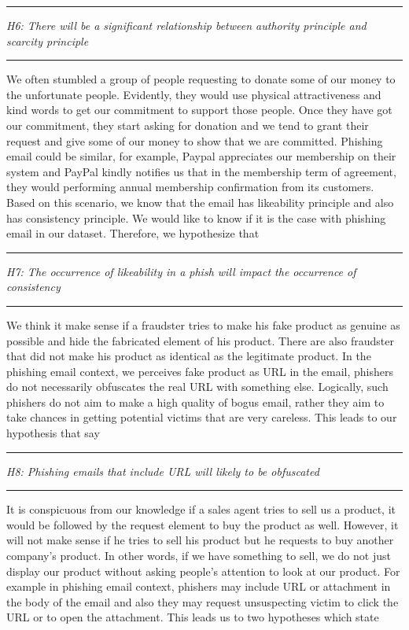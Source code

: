 \rule[0.5ex]{1\columnwidth}{1pt}

\textit{H6: There will be a significant relationship between authority
principle and scarcity principle}

\rule[0.5ex]{1\columnwidth}{1pt}

We often stumbled a group of people requesting to donate some of our
money to the unfortunate people. Evidently, they would use physical
attractiveness and kind words to get our commitment to support those
people. Once they have got our commitment, they start asking for donation
and we tend to grant their request and give some of our money to show
that we are committed. Phishing email could be similar, for example,
Paypal appreciates our membership on their system and PayPal kindly
notifies us that in the membership term of agreement, they would performing
annual membership confirmation from its customers. Based on this scenario,
we know that the email has likeability principle and also has consistency
principle. We would like to know if it is the case with phishing email
in our dataset. Therefore, we hypothesize that

\rule[0.5ex]{1\columnwidth}{1pt}

\textit{H7: The occurrence of likeability in a phish will impact the
occurrence of consistency}

\rule[0.5ex]{1\columnwidth}{1pt}

We think it make sense if a fraudster tries to make his fake product
as genuine as possible and hide the fabricated element of his product.
There are also fraudster that did not make his product as identical
as the legitimate product. In the phishing email context, we perceives
fake product as URL in the email, phishers do not necessarily obfuscates
the real URL with something else. Logically, such phishers do not
aim to make a high quality of bogus email, rather they aim to take
chances in getting potential victims that are very careless. This
leads to our hypothesis that say

\rule[0.5ex]{1\columnwidth}{1pt}

\textit{H8: Phishing emails that include URL will likely to be obfuscated}

\rule[0.5ex]{1\columnwidth}{1pt}

It is conspicuous from our knowledge if a sales agent tries to sell
us a product, it would be followed by the request element to buy the
product as well. However, it will not make sense if he tries to sell
his product but he requests to buy another company's product. In other
words, if we have something to sell, we do not just display our product
without asking people's attention to look at our product. For example
in phishing email context, phishers may include URL or attachment
in the body of the email and also they may request unsuspecting victim
to click the URL or to open the attachment. This leads us to two hypotheses
which state


